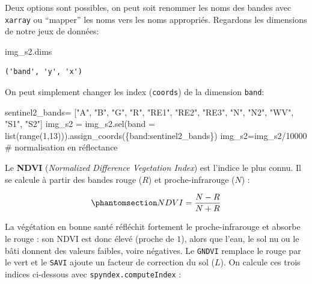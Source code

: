 \documentclass[
  french,
  11pt,
  letterpaper,
  open=any,
  twoside=false,
  french]{scrbook}
\newenvironment{Shaded}{\begin{snugshade}}{\end{snugshade}}
\newcommand{\BuiltInTok}[1]{\textcolor[rgb]{0.00,0.23,0.31}{#1}}
\newcommand{\CommentTok}[1]{\textcolor[rgb]{0.37,0.37,0.37}{#1}}
\newcommand{\DecValTok}[1]{\textcolor[rgb]{0.68,0.00,0.00}{#1}}
\newcommand{\NormalTok}[1]{\textcolor[rgb]{0.00,0.23,0.31}{#1}}
\newcommand{\OperatorTok}[1]{\textcolor[rgb]{0.37,0.37,0.37}{#1}}
\newcommand{\StringTok}[1]{\textcolor[rgb]{0.13,0.47,0.30}{#1}}
\begin{document}
Deux options sont possibles, on peut soit renommer les noms des bandes
avec \texttt{xarray} ou ``mapper'' les noms vers les noms appropriés.
Regardons les dimensions de notre jeux de données:

\begin{Shaded}
\begin{Highlighting}[]
\NormalTok{img\_s2.dims}
\end{Highlighting}
\end{Shaded}

\begin{verbatim}
('band', 'y', 'x')
\end{verbatim}

On peut simplement changer les index (\texttt{coords}) de la dimension
\texttt{band}:

\begin{Shaded}
\begin{Highlighting}[]
\NormalTok{sentinel2\_bands}\OperatorTok{=}\NormalTok{ [}\StringTok{"A"}\NormalTok{, }\StringTok{"B"}\NormalTok{, }\StringTok{"G"}\NormalTok{, }\StringTok{"R"}\NormalTok{, }\StringTok{"RE1"}\NormalTok{, }\StringTok{"RE2"}\NormalTok{, }\StringTok{"RE3"}\NormalTok{, }\StringTok{"N"}\NormalTok{, }\StringTok{"N2"}\NormalTok{, }\StringTok{"WV"}\NormalTok{, }\StringTok{"S1"}\NormalTok{, }\StringTok{"S2"}\NormalTok{]}
\NormalTok{img\_s2 }\OperatorTok{=}\NormalTok{ img\_s2.sel(band }\OperatorTok{=} \BuiltInTok{list}\NormalTok{(}\BuiltInTok{range}\NormalTok{(}\DecValTok{1}\NormalTok{,}\DecValTok{13}\NormalTok{))).assign\_coords(\{}\StringTok{\textquotesingle{}band\textquotesingle{}}\NormalTok{:sentinel2\_bands\})}
\NormalTok{img\_s2}\OperatorTok{=}\NormalTok{img\_s2}\OperatorTok{/}\DecValTok{10000} \CommentTok{\# normalisation en réflectance}
\end{Highlighting}
\end{Shaded}

Le \textbf{NDVI} (\emph{Normalized Difference Vegetation Index}) est
l'indice le plus connu. Il se calcule à partir des bandes rouge (\(R\))
et proche-infrarouge (\(N\)) :

\begin{equation}\protect\phantomsection\label{eq-ndvi}{ NDVI = \frac{N - R}{N + R} }\end{equation}

La végétation en bonne santé réfléchit fortement le proche-infrarouge et
absorbe le rouge : son NDVI est donc élevé (proche de \(1\)), alors que
l'eau, le sol nu ou le bâti donnent des valeurs faibles, voire
négatives. Le \texttt{GNDVI} remplace le rouge par le vert et le
\texttt{SAVI} ajoute un facteur de correction du sol (\(L\)). On calcule
ces trois indices ci-dessous avec \texttt{spyndex.computeIndex} :
\end{document}

